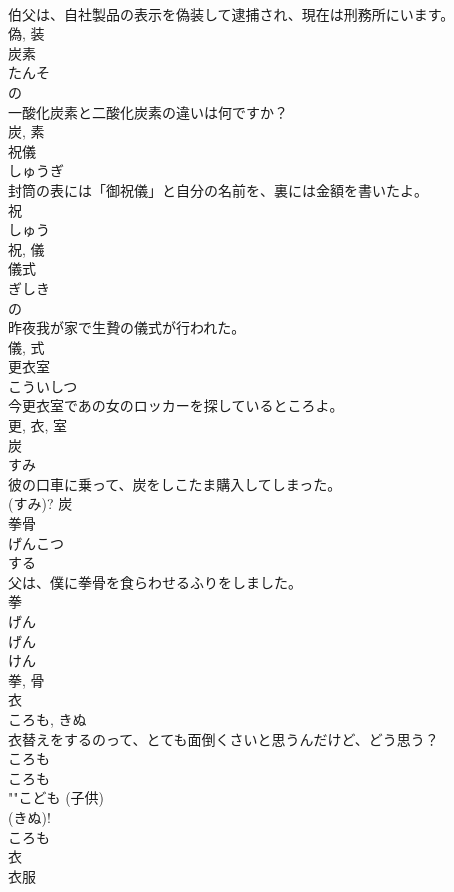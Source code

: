 \documentclass[8pt]{extreport}
\begin{document}
\begin{CJK}{UTF8}{min}
\\	伯父は、自社製品の表示を偽装して逮捕され、現在は刑務所にいます。	
\\	偽, 装	
\\	炭素	
\\	たんそ	
\\	の 
\\	一酸化炭素と二酸化炭素の違いは何ですか？	
\\	炭, 素	
\\	祝儀	
\\	しゅうぎ	
\\	封筒の表には「御祝儀」と自分の名前を、裏には金額を書いたよ。	
\\	祝 
\\	しゅう 
\\	祝, 儀	
\\	儀式	
\\	ぎしき	
\\	の 
\\	昨夜我が家で生贄の儀式が行われた。	
\\	儀, 式	
\\	更衣室	
\\	こういしつ	
\\	今更衣室であの女のロッカーを探しているところよ。	
\\	更, 衣, 室	
\\	炭	
\\	すみ	
\\	彼の口車に乗って、炭をしこたま購入してしまった。	
\\	(すみ)?	炭	
\\	拳骨	
\\	げんこつ	
\\	する 
\\	父は、僕に拳骨を食らわせるふりをしました。	
\\	拳 
\\	げん 
\\	げん 
\\	けん 
\\	拳, 骨	
\\	衣	
\\	ころも, きぬ	
\\	衣替えをするのって、とても面倒くさいと思うんだけど、どう思う？	
\\	ころも 
\\	ころも 
\\	""こども (子供) 
\\	(きぬ)!
\\	ころも 
\\	衣	
\\	衣服	

\end{CJK}
\end{document}
